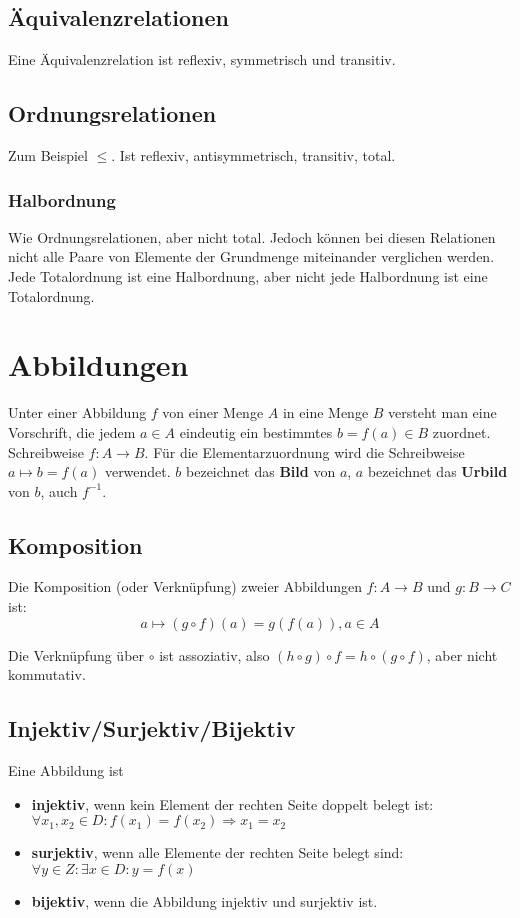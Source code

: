 \documentclass[10pt,a4paper,twoside,twocolumn]{article}
\begin{document}
	\subsection{Äquivalenzrelationen}
	
	Eine Äquivalenzrelation ist reflexiv, symmetrisch und transitiv.
	
	\subsection{Ordnungsrelationen}
	
	Zum Beispiel $ \le $. Ist reflexiv, antisymmetrisch, transitiv, total.
	
	\subsubsection{Halbordnung}
	
	Wie Ordnungsrelationen, aber nicht total. Jedoch können bei diesen Relationen nicht alle Paare von Elemente der Grundmenge miteinander verglichen werden. Jede Totalordnung ist eine Halbordnung, aber nicht jede Halbordnung ist eine Totalordnung.
	
	\section{Abbildungen}
	
	Unter einer Abbildung $ f $ von einer Menge $ A $ in eine Menge $ B $ versteht man eine Vorschrift, die jedem $ a \in A $ eindeutig ein bestimmtes $ b = f(a) \in B $ zuordnet. Schreibweise $ f : A \to B $. Für die Elementarzuordnung wird die Schreibweise $ a \mapsto b = f(a) $ verwendet. $ b $ bezeichnet das \textbf{Bild} von $ a $, $ a $ bezeichnet das \textbf{Urbild} von $ b $, auch $ f^{-1} $.
	
	\subsection{Komposition}
	
	Die Komposition (oder Verknüpfung) zweier Abbildungen $ f : A \to B $ und $ g : B \to C $ ist:
	\[ a \mapsto (g \circ f)(a) = g(f(a)), a \in A \]
	
	Die Verknüpfung über $ \circ $ ist assoziativ, also $ (h \circ g) \circ f = h \circ (g \circ f) $, aber nicht kommutativ.
	
	\subsection{Injektiv/Surjektiv/Bijektiv}
	Eine Abbildung ist
	\begin{itemize}
		\setlength\itemsep{0em}
		\item \textbf{injektiv}, wenn kein Element der rechten Seite doppelt belegt ist: $ \forall x_1, x_2 \in D: f(x_1)=f(x_2) \Rightarrow x_1=x_2 $
		\item \textbf{surjektiv}, wenn alle Elemente der rechten Seite belegt sind: $ \forall y\in Z: \exists x\in D: y=f(x) $
		\item \textbf{bijektiv}, wenn die Abbildung injektiv und surjektiv ist.
	\end{itemize}
	
\end{document}
